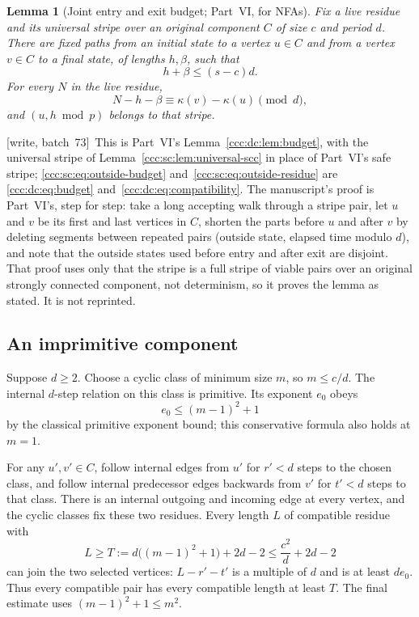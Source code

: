 \documentclass[11pt,letterpaper]{article}
\newtheorem{lemma}[theorem]{Lemma}
\theoremstyle{definition}
\theoremstyle{remark}
\newcommand{\wsevthree}{\textup{[write, batch~73]}}
\begin{document}
\begin{lemma}[Joint entry and exit budget; Part~VI, for NFAs]\label{ccc:sc:lem:outside}
Fix a live residue and its universal stripe over an original component $C$ of size $c$ and period $d$. There are fixed paths from an initial state to a vertex $u\in C$ and from a vertex $v\in C$ to a final state, of lengths $h,\beta$, such that
\begin{equation}\label{ccc:sc:eq:outside-budget}
 h+\beta\le(s-c)d.
\end{equation}
For every $N$ in the live residue,
\begin{equation}\label{ccc:sc:eq:outside-residue}
 N-h-\beta\equiv\kappa(v)-\kappa(u)\pmod d,
\end{equation}
and $(u,h\bmod p)$ belongs to that stripe.
\end{lemma}
\noindent\wsevthree\ This is Part~VI's Lemma~\ref{ccc:dc:lem:budget}, with
the universal stripe of Lemma~\ref{ccc:sc:lem:universal-scc} in place of
Part~VI's safe stripe; \eqref{ccc:sc:eq:outside-budget}
and~\eqref{ccc:sc:eq:outside-residue} are \eqref{ccc:dc:eq:budget}
and~\eqref{ccc:dc:eq:compatibility}. The manuscript's proof is Part~VI's, step
for step: take a long accepting walk through a stripe pair, let $u$ and $v$
be its first and last vertices in $C$, shorten the parts before $u$ and after
$v$ by deleting segments between repeated pairs (outside state, elapsed time
modulo $d$), and note that the outside states used before entry and after
exit are disjoint. That proof uses only that the stripe is a full stripe of
viable pairs over an original strongly connected component, not
determinism, so it proves the lemma as stated. It is not reprinted.

\subsection{An imprimitive component}

Suppose $d\ge2$. Choose a cyclic class of minimum size $m$, so $m\le c/d$. The internal $d$-step relation on this class is primitive. Its exponent $e_0$ obeys
\[
 e_0\le(m-1)^2+1
\]
by the classical primitive exponent bound; this conservative formula also holds at $m=1$.

For any $u',v'\in C$, follow internal edges from $u'$ for $r'<d$ steps to the chosen class, and follow internal predecessor edges backwards from $v'$ for $t'<d$ steps to that class. There is an internal outgoing and incoming edge at every vertex, and the cyclic classes fix these two residues. Every length $L$ of compatible residue with
\begin{equation}\label{ccc:sc:eq:imprimitive-threshold}
 L\ge T:=d\bigl((m-1)^2+1\bigr)+2d-2
       \le\frac{c^2}{d}+2d-2
\end{equation}
can join the two selected vertices: $L-r'-t'$ is a multiple of $d$ and is at least $de_0$. Thus every compatible pair has every compatible length at least $T$. The final estimate uses $(m-1)^2+1\le m^2$.
\end{document}

